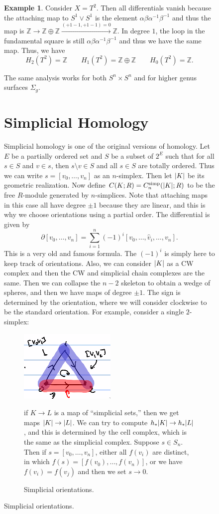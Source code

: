 \documentclass[leqno, openany]{memoir}
\theoremstyle{definition}
\newtheorem{exm}[thm]{Example}
\theoremstyle{remark}
\theoremstyle{plain}
\theoremstyle{definition}
\theoremstyle{remark}
\newcommand{\Z}{\mathbb{Z}}
\newcommand{\mr}[1]{\mathrm{#1}}
\newcommand{\wh}[1]{\widehat{#1}}
\begin{document}
\begin{figure}[H]
\begin{exm} Consider $X = T^2$. Then all differentials vanish because the
    attaching map to $S^1 \vee S^1$ is the element $\alpha \beta \alpha^{-1}
    \beta^{-1}$ and thus the map is $\Z \to \Z \oplus \Z \xrightarrow{(+1-1,
    +1-1) = 0} \Z$. In degree $1$, the loop in the fundamental square is still
    $\alpha \beta \alpha^{-1} \beta^{-1}$ and thus we have the same map. Thus,
    we have \[ H_2(T^2) = \Z \qquad H_1(T^2) = \Z \oplus \Z \qquad H_0(T^2) =
    \Z. \] \end{exm}

The same analysis works for both $S^n \times S^n$ and for higher genus surfaces
$\Sigma_g$.

\section{Simplicial Homology}%

Simplicial homology is one of the original versions of homology. Let $E$ be a
partially ordered set and $S$ be a subset of $2^E$ such that for all $s \in S$
and $v \in s$, then $s \setminus v \in S$ and all $s \in S$ are totally
ordered. Thus we can write $s = [v_0, \ldots, v_n]$ as an $n$-simplex. Then let
$\abs{K}$ be its geometric realization. Now define $C(K; R) =
C_n^{\mr{simp}}(\abs{K}; R)$ to be the free $R$-module generated by
$n$-simplices. Note that attaching maps in this case all have degree $\pm 1$
because they are linear, and this is why we choose orientations using a partial
order. The differential is given by \[ \partial [v_0, \ldots, v_n] =
\sum_{i=1}^n {(-1)}^i [v_0, \ldots, \wh{v}_i, \ldots, v_n]. \] This is a very
old and famous formula. The $(-1)^i$ is simply here to keep track of
orientations. Also, we can consider $\abs{K}$ as a CW complex and then the CW
and simplicial chain complexes are the same. Then we can collapse the $n-2$
skeleton to obtain a wedge of spheres, and then we have maps of degree $\pm 1$.
The sign is determined by the orientation, where we will consider clockwise to
be the standard orientation. For example, consider a single $2$-simplex:
\begin{figure}[H] \centering \includegraphics[scale=1]{simporient.png}
    \caption{Simplicial orientations.}%
    if $K \to L$ is a map of ``simplicial sets,'' then we get maps $\abs{K} \to
    \abs{L}$. We can try to compute $h_*\abs{K} \to h_*\abs{L}$, and this is
    determined by the cell complex, which is the same as the simplicial
    complex. Suppose $s \in S_n$. Then if $s = [v_0, \ldots, v_n]$, either all
    $f(v_i)$ are distinct, in which $f(s) = [f(v_0), \ldots, f(v_n)]$, or we
    have $f(v_i) = f(v_j)$ and then we set $s \to 0$.


\end{figure}
\end{figure}
\end{document}
